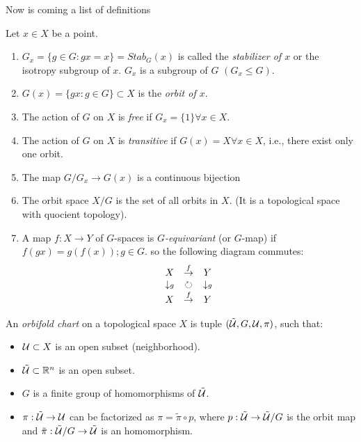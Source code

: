 Now is coming a list of definitions
\begin{defn}
Let  $x\in X$ be a point.
\begin{enumerate}
\item $G_x=\{g\in G : gx=x\}=Stab_G(x)$ is called the \emph{stabilizer of $x$} or the isotropy subgroup of $x$. $G_x$ is a subgroup of $G$ $(G_x\leqslant G).$
\item $G(x)=\{gx : g\in G\}\subset X$ is the \emph{orbit of $x$}.
\item The action of $G$ on $X$ is \emph{free} if $G_x=\{ 1\} \forall x\in X.$
\item The action of $G$ on $X$ is \emph{transitive} if $G(x)=X \forall x\in X$, i.e., there exist only one orbit.
\item The map $G/G_x\rightarrow G(x)$ is a continuous bijection
\item The orbit space $X/G$ is the set of all orbits in $X$. (It is a topological space with quocient topology).
\item A map $f:X\rightarrow Y$ of $G$-spaces is \emph{$G$-equivariant} (or $G$-map) if $f(gx)=g(f(x)); g\in G$. so the following diagram commutes:
 $$\begin{array}[c]{ccc}
X&\stackrel{f}{\rightarrow}&Y\\
\downarrow\scriptstyle{g}&\circlearrowright&\downarrow\scriptstyle{g}\\
X&\stackrel{f}{\rightarrow}&Y
\end{array}$$
\end{enumerate}
\end{defn}


\begin{defn}
An \emph{orbifold chart} on a topological space $X$ is tuple $(\tilde{\mathcal{U}},G,\mathcal{U}, \pi)$, such that:
\begin{itemize}
  \item $\mathcal{U}\subset X$ is an open subset (neighborhood).
  \item $\tilde{\mathcal{U}}\subset \mathbb{R}^n$ is an open subset.
  \item $G$ is a finite group of homomorphisms of  $\tilde{\mathcal{U}}$.
  \item $\pi:\tilde{\mathcal{U}}\rightarrow \mathcal{U}$ can be factorized as $\pi=\tilde{\pi}\circ p$, where 
  $p:\tilde{\mathcal{U}}\rightarrow \tilde{\mathcal{U}}/G$ is the orbit map and $\tilde{\pi}:\tilde{\mathcal{U}}/G\rightarrow \tilde{\mathcal{U}}$ is an homomorphism.
\end{itemize}
\end{defn}





